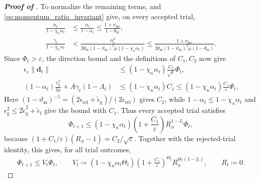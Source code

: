 \documentclass{article}
\begin{document}
\begin{proof}[\textbf{Proof of }]
To normalize the remaining terms,  and
\eqref{eq:momentum_ratio_invariant} give, on every accepted trial,
\[
\begin{aligned}
\frac{\alpha_t}{1-\chi_\kappa\alpha_t}
&\le\frac{\alpha_t}{1-\alpha_t}
\le\frac{1+\nu_{\mathrm{inc}}}{1-\theta_{\mathrm{m}}},\\
\frac{\gamma_t}{1-\chi_\kappa\alpha_t}
&<\frac{\alpha_t^2}
{2\theta_{\mathrm{m}}(1-\vartheta_{\mathrm{m}})^2\mu
(1-\chi_\kappa\alpha_t)}
\le\frac{1+\nu_{\mathrm{inc}}}
{2\theta_{\mathrm{m}}(1-\vartheta_{\mathrm{m}})^2\mu(1-\theta_{\mathrm{m}})}.
\end{aligned}
\]
Since \(\Phi_t>\varepsilon\), the direction bound and the definitions
of \(C_1,C_2\) now give
\[
\begin{aligned}
\epsilon_{\mathrm{c}}\|\bm{d}_t\|
&\le(1-\chi_\kappa\alpha_t)
\frac{C_2}{\sqrt\varepsilon}\Phi_t,\\
(1-\alpha_t)\frac{\epsilon_{\mathrm{g}}^2}{2\mu}
+A\gamma_t(1-\Lambda_t)
&\le(1-\chi_\kappa\alpha_t)C_1
\le(1-\chi_\kappa\alpha_t)\frac{C_1}{\varepsilon}\Phi_t.
\end{aligned}
\]
Here \((1-\vartheta_{\mathrm{m}})^{-1}
=(2\epsilon_{\mathrm{rel}}+\widetilde\epsilon_{\mathrm{g}})/(2\epsilon_{\mathrm{rel}})\)
gives \(C_2\), while \(1-\alpha_t\le1-\chi_\kappa\alpha_t\)
and \(\epsilon_{\mathrm{g}}^2\le2\widetilde\epsilon_{\mathrm{g}}^2+\widetilde\epsilon_{\mathrm{f}}\)
give the bound with \(C_1\).
Thus every accepted trial satisfies
\[
\Phi_{t+1}
\le
(1-\chi_\kappa\alpha_t)
\left(1+\frac{C_1}{\varepsilon}\right)
R_\phi^{1-I_t}\Phi_t,
\]
because
\((1+C_1/\varepsilon)(R_\phi-1)=C_2/\sqrt\varepsilon\).
Together with the rejected-trial identity, this gives, for all trial
outcomes,
\begin{equation}\label{eq:affine_module_mu_cfo}
\begin{aligned}
\Phi_{t+1}\le V_t\Phi_t,\qquad
V_t\coloneqq 
(1-\chi_\kappa\alpha_t\Theta_t)
\left(1+\frac{C_1}{\varepsilon}\right)^{\Theta_t}
R_\phi^{\Theta_t(1-I_t)}
,
\qquad R_t\coloneqq 0.
\end{aligned}
\end{equation}


\end{proof}
\end{document}
